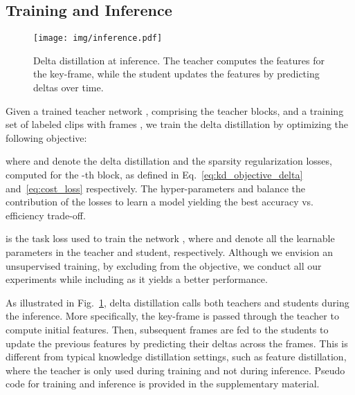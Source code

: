 \documentclass[runningheads]{llncs}
\begin{document}
\subsection{Training and Inference}
\label{sec:training}
\begin{figure}[t!]
\centering
\texttt{[image: img/inference.pdf]}
\caption{Delta distillation at inference.
The teacher computes the features for the key-frame, while the student updates the features by predicting deltas over time.}
\label{fig:dd_forward_pass}
\vspace{-4mm}
\end{figure} Given a trained teacher network , comprising the teacher blocks, and a training set of labeled clips with  frames , we train the delta distillation by optimizing the following objective:

where  and  denote the delta distillation and the sparsity regularization losses, computed for the -th block, as defined in Eq.~\ref{eq:kd_objective_delta} and~\ref{eq:cost_loss} respectively. The hyper-parameters  and  balance the contribution of the losses to learn a model yielding the best accuracy vs. efficiency trade-off.

 is the task loss used to train the network , where  and  denote all the learnable parameters in the teacher and student, respectively.
Although we envision an unsupervised training, by excluding  from the objective, we conduct all our experiments while including  as it yields a better performance.

As illustrated in Fig.~\ref{fig:dd_forward_pass}, delta distillation calls both teachers and students during the inference. More specifically, the key-frame is passed through the teacher to compute initial features. Then,  subsequent frames are fed to the students to update the previous features by predicting their deltas across the frames. This is different from typical knowledge distillation settings, such as feature distillation, where the teacher is only used during training and not during inference.
Pseudo code for training and inference is provided in the supplementary material.
\end{document}
